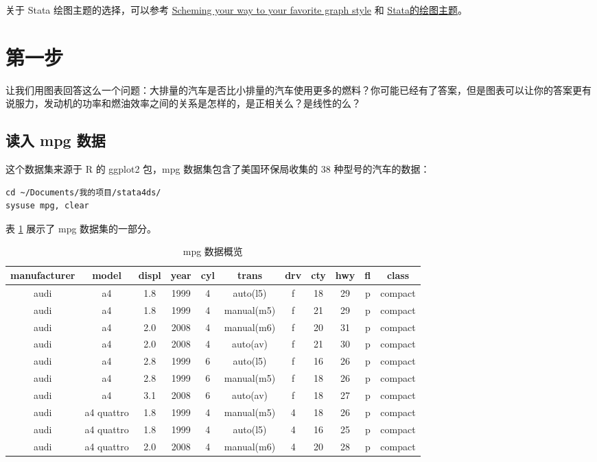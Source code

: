 关于 Stata 绘图主题的选择，可以参考 \href{https://blog.stata.com/2018/10/02/scheming-your-way-to-your-favorite-graph-style/}{Scheming your way to your favorite graph style} 和 \href{https://www.czxa.top/posts/24695/}{Stata的绘图主题}。

\section{第一步}

\begin{problem}
  让我们用图表回答这么一个问题：大排量的汽车是否比小排量的汽车使用更多的燃料？你可能已经有了答案，但是图表可以让你的答案更有说服力，发动机的功率和燃油效率之间的关系是怎样的，是正相关么？是线性的么？
\end{problem}

\subsection{读入 mpg 数据}

这个数据集来源于 R 的 ggplot2 包，mpg 数据集包含了美国环保局收集的 38 种型号的汽车的数据：

\begin{lstlisting}
cd ~/Documents/我的项目/stata4ds/
sysuse mpg, clear
\end{lstlisting}

表 \ref{tab:mpg} 展示了 mpg 数据集的一部分。

\begin{table}[htbp]
\caption{\label{tab:mpg}mpg 数据概览}
\centering
\begin{tabular}{ccccccccccc}
\toprule
manufacturer & model & displ & year & cyl & trans & drv & cty & hwy & fl & class\\
\midrule
audi & a4 & 1.8 & 1999 & 4 & auto(l5) & f & 18 & 29 & p & compact\\
audi & a4 & 1.8 & 1999 & 4 & manual(m5) & f & 21 & 29 & p & compact\\
audi & a4 & 2.0 & 2008 & 4 & manual(m6) & f & 20 & 31 & p & compact\\
audi & a4 & 2.0 & 2008 & 4 & auto(av) & f & 21 & 30 & p & compact\\
audi & a4 & 2.8 & 1999 & 6 & auto(l5) & f & 16 & 26 & p & compact\\
\addlinespace
audi & a4 & 2.8 & 1999 & 6 & manual(m5) & f & 18 & 26 & p & compact\\
audi & a4 & 3.1 & 2008 & 6 & auto(av) & f & 18 & 27 & p & compact\\
audi & a4 quattro & 1.8 & 1999 & 4 & manual(m5) & 4 & 18 & 26 & p & compact\\
audi & a4 quattro & 1.8 & 1999 & 4 & auto(l5) & 4 & 16 & 25 & p & compact\\
audi & a4 quattro & 2.0 & 2008 & 4 & manual(m6) & 4 & 20 & 28 & p & compact\\
\bottomrule
\end{tabular}
\end{table}

